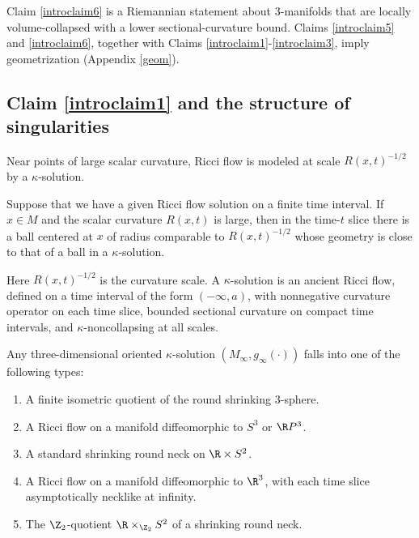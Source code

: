 Claim \ref{introclaim6} is a Riemannian statement about $3$-manifolds that
are locally volume-collapsed with a lower sectional-curvature bound.  Claims
\ref{introclaim5} and \ref{introclaim6}, together with Claims
\ref{introclaim1}-\ref{introclaim3}, imply geometrization (Appendix
\ref{geom}).

\subsection{Claim \ref{introclaim1} and the structure of singularities}

Near points of large scalar curvature, Ricci flow is modeled at scale
$R(x,t)^{-1/2}$ by a $\kappa$-solution.

\begin{proposition}
  \label{prop:kl-overview-ricci-flow-approach-manifold-geometrization-existence-kappa-solutions}
\label{introclaim7}
Suppose that we have a given Ricci flow solution on a finite time interval.
If $x\in M$ and the scalar curvature $R(x,t)$ is large, then in the time-$t$
slice there is a ball centered at $x$ of radius comparable to
$R(x,t)^{-1/2}$ whose geometry is close to that of a ball in a
$\kappa$-solution.
\end{proposition}

Here $R(x,t)^{-1/2}$ is the curvature scale.  A $\kappa$-solution is an
ancient Ricci flow, defined on a time interval of the form $(-\infty,a)$,
with nonnegative curvature operator on each time slice,
bounded sectional curvature on compact time intervals, and
$\kappa$-noncollapsing at all scales.

\begin{proposition}
  \label{prop:kl-overview-ricci-flow-approach-manifold-geometrization-rigidity-kappa-solutions}
 \cite{Perelman2} \label{introclaim8}
Any three-dimensional oriented $\kappa$-solution $(M_\infty,g_\infty(\cdot))$
falls into one of the following types:
\begin{enumerate}
\item A finite isometric quotient of the round shrinking $3$-sphere.
\item A Ricci flow on a manifold diffeomorphic to $S^3$ or $\R P^3$.
\item A standard shrinking round neck on $\R\times S^2$.
\item A Ricci flow on a manifold diffeomorphic to $\R^3$, with each time
slice asymptotically necklike at infinity.
\item The $\Z_2$-quotient $\R\times_{\Z_2}S^2$ of a shrinking round neck.
\end{enumerate}
\end{proposition}

